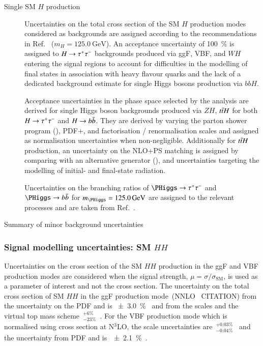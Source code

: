 \begin{description}
\item[Single SM $H$ production] Uncertainties on the total cross
  section of the SM $H$ production modes considered as backgrounds are
  assigned according to the recommendations in
  Ref.~\cite{deFlorian:2016spz} ($m_{H} = \SI{125.0}{\GeV}$). An
  acceptance uncertainty of \SI{100}{\percent} is assigned to
  $H \to \tau^{+} \tau^{-}$ backgrounds produced via ggF, VBF, and $WH$ entering
  the signal regions to account for difficulties in the modelling of
  final states in association with heavy flavour
  quarks and the lack of a dedicated background
  estimate for single Higgs bosons production via $bbH$.

  Acceptance uncertainties in the phase space selected by the analysis
  are derived for single Higgs boson backgrounds produced via $ZH$,
  $t\bar{t} H$ for both $H \to \tau^{+} \tau^{-}$ and $H \to b\bar{b}$. They are
  derived by varying the parton shower program (\HERWIG[7]),
  PDF+\alphas, and factorisation / renormalisation scales and assigned
  as normalisation uncertainties when non-negligible. Additionally for
  $t\bar{t} H$ production, an uncertainty on the NLO+PS matching is
  assigned by comparing with an alternative generator
  (\MGNLO[v2.6.0]), and uncertainties targeting the modelling of
  initial- and final-state radiation.

  Uncertainties on the branching ratios of $\PHiggs \to \tautau$ and
  $\PHiggs \to \bbbar$ for $m_{\PHiggs} = \SI{125.0}{\GeV}$ are
  assigned to the relevant processes and are taken from
  Ref.~\cite{deFlorian:2016spz}.
\end{description}


\begin{table}[htbp]
  \centering


  \caption{Summary of minor background uncertainties}
\end{table}

\subsubsection{Signal modelling uncertainties: SM $HH$}

Uncertainties on the cross section of the SM $HH$ production in the
ggF and VBF production modes are considered when the signal strength,
$\mu = \sigma / \sigma_{\text{SM}}$, is used as a parameter of
interest and not the cross section. The uncertainty on the total cross
section of SM $HH$ in the ggF production mode~(NNLO
\FTapprox~CITATION) from the uncertainty on the PDF and \alphas is
\SI{\pm 3.0}{\percent}~\cite{LHCHWGHH} and from the scales and the
virtual top mass scheme~$^{+6\%}_{-23\%}$~\cite{Baglio:2020wgt}. For
the VBF production mode which is normalised using cross section at
N$^3$LO, the scale uncertainties
are~$^{+0.03\%}_{-0.04\%}$~\cite{LHCHWGHH} and the uncertainty from
PDF and \alphas is~\SI{\pm 2.1}{\percent}~\cite{LHCHWGHH}.

